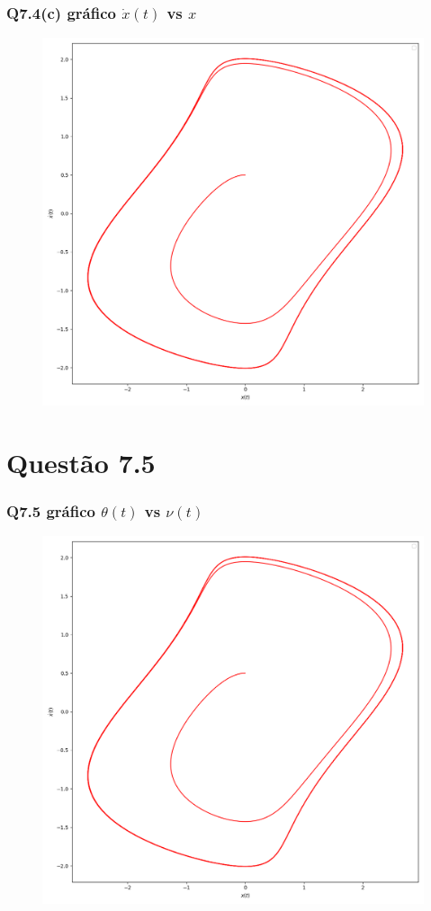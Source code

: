 \documentclass[12pt]{article}
\begin{document}
\clearpage
\subsubsection*{Q7.4(c) gráfico $\dot x(t)$ vs $x$}

\begin{figure}[!hbt]
  \begin{center}
    \includegraphics[scale=0.7]{./Cod_74/x(t)_xdot(t)}
  \end{center}
\end{figure}

\clearpage
\section*{Questão 7.5}
\subsubsection*{Q7.5 gráfico $\theta(t)$ vs $\nu(t)$}

\begin{figure}[!hbt]
  \begin{center}
    \includegraphics[scale=0.7]{./Cod_74/x(t)_xdot(t)}
  \end{center}
\end{figure}
\end{document}
